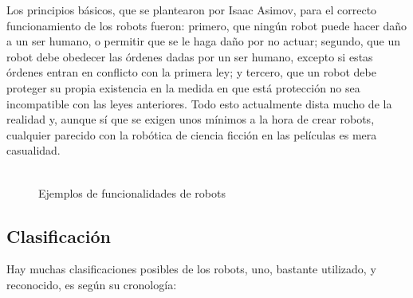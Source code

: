\hspace{1cm} Los principios básicos, que se plantearon por Isaac Asimov, para el correcto funcionamiento de los robots fueron: primero, que ningún robot puede hacer daño a un ser humano, o permitir que se le haga daño por no actuar; segundo, que un robot debe obedecer las órdenes dadas por un ser humano, excepto si estas órdenes entran en conflicto con la primera ley; y tercero, que un robot debe proteger su propia existencia en la medida en que está protección no sea incompatible con las leyes anteriores. Todo esto actualmente  dista mucho de la realidad y, aunque sí que se exigen unos mínimos a la hora de crear robots, cualquier parecido con la robótica de ciencia ficción en las películas es mera casualidad.
\\
\\
\begin{figure}[H]
 \centering
 \caption{Ejemplos de funcionalidades de robots}
 \label{f:Ejemplos de funcionalidades de robots}
\end{figure}  

\subsection{Clasificación}
\hspace{1cm} Hay muchas clasificaciones posibles de los robots, uno, bastante utilizado, y reconocido, es según su cronología:

